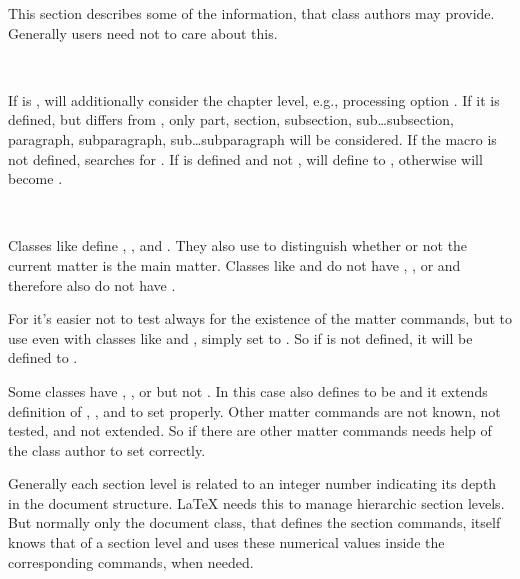 This section describes some of the information, that class authors may
provide. Generally users need not to care about this.

\begin{Declaration}
  \ \ \ %
  \ %
\end{Declaration}
If  is ,  will additionally
consider the chapter level, e.g., processing option . If it
is defined, but differs from , only part, section, subsection,
sub\dots subsection, paragraph, subparagraph, sub\dots subparagraph will be
considered. If the macro is not defined,  searches for
. If  is defined and not ,
 will define  to , otherwise
 will become .%
\EndIndexGroup


\begin{Declaration}
  \ \ \ %
  \ %
\end{Declaration}
Classes like  define , , and
. They also use  to distinguish whether
or not the current matter is the main matter. Classes like  and
 do not have , , or
 and therefore also do not have .

For  it's easier not to test always for the existence of the
matter commands, but to use  even with classes like
 and , simply set to . So if
 is not defined, it will be defined to .

Some classes have , , or
 but not . In this case
 also defines  to be 
and it extends definition of , , and
 to set  properly. Other matter
commands are not known, not tested, and not extended. So if there are other
matter commands  needs help of the class author to set
 correctly.%
\EndIndexGroup


\begin{Declaration}
\end{Declaration}
Generally each section level is related to an integer number indicating its
depth in the document structure. \LaTeX{} needs this to manage hierarchic
section levels. But normally only the document class, that defines the section
commands, itself knows that  of a section level and uses
these numerical values inside the corresponding commands, when needed.

